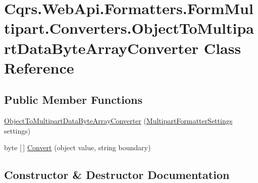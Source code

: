 \hypertarget{classCqrs_1_1WebApi_1_1Formatters_1_1FormMultipart_1_1Converters_1_1ObjectToMultipartDataByteArrayConverter}{}\section{Cqrs.\+Web\+Api.\+Formatters.\+Form\+Multipart.\+Converters.\+Object\+To\+Multipart\+Data\+Byte\+Array\+Converter Class Reference}
\label{classCqrs_1_1WebApi_1_1Formatters_1_1FormMultipart_1_1Converters_1_1ObjectToMultipartDataByteArrayConverter}
\subsection*{Public Member Functions}
\begin{DoxyCompactItemize}
\item 
\hyperlink{classCqrs_1_1WebApi_1_1Formatters_1_1FormMultipart_1_1Converters_1_1ObjectToMultipartDataByteArrayConverter_a1e647950d2959aa53e54a17ba86df058}{Object\+To\+Multipart\+Data\+Byte\+Array\+Converter} (\hyperlink{classCqrs_1_1WebApi_1_1Formatters_1_1FormMultipart_1_1Infrastructure_1_1MultipartFormatterSettings}{Multipart\+Formatter\+Settings} settings)
\item 
byte \mbox{[}$\,$\mbox{]} \hyperlink{classCqrs_1_1WebApi_1_1Formatters_1_1FormMultipart_1_1Converters_1_1ObjectToMultipartDataByteArrayConverter_af7bd8ac108a7e95f5961a14064595f84}{Convert} (object value, string boundary)
\end{DoxyCompactItemize}


\subsection{Constructor \& Destructor Documentation}
\mbox{\label{classCqrs_1_1WebApi_1_1Formatters_1_1FormMultipart_1_1Converters_1_1ObjectToMultipartDataByteArrayConverter_a1e647950d2959aa53e54a17ba86df058}} 
